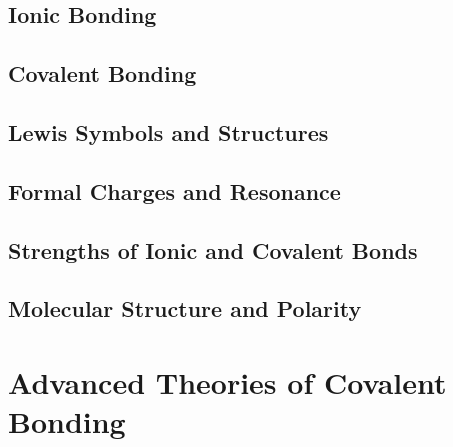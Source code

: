 \documentclass[12pt, openany, letterpaper]{memoir}
\begin{document}
\section{Ionic Bonding}

\section{Covalent Bonding}

\section{Lewis Symbols and Structures}

\section{Formal Charges and Resonance}

\section{Strengths of Ionic and Covalent Bonds}

\section{Molecular Structure and Polarity}

\chapter{Advanced Theories of Covalent Bonding}
\end{document}
